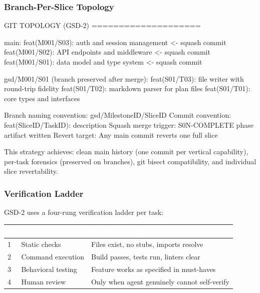 \documentclass[11pt,letterpaper]{article}
\newcommand{\tableheader}[1]{\textbf{\sffamily\textcolor{white}{#1}}}
\begin{document}
\subsubsection{Branch-Per-Slice Topology}

\begin{asciibox}
GIT TOPOLOGY (GSD-2)
====================

main:
  feat(M001/S03): auth and session management       <- squash commit
  feat(M001/S02): API endpoints and middleware      <- squash commit
  feat(M001/S01): data model and type system        <- squash commit

gsd/M001/S01 (branch preserved after merge):
  feat(S01/T03): file writer with round-trip fidelity
  feat(S01/T02): markdown parser for plan files
  feat(S01/T01): core types and interfaces

Branch naming convention: gsd/{MilestoneID}/{SliceID}
Commit convention:        feat({SliceID}/{TaskID}): description
Squash merge trigger:     S0N-COMPLETE phase artifact written
Revert target:            Any main commit reverts one full slice
\end{asciibox}

This strategy achieves: clean main history (one commit per vertical capability), per-task forensics (preserved on branches), git bisect compatibility, and individual slice revertability.

\subsubsection{Verification Ladder}

GSD-2 uses a four-rung verification ladder per task:

\begin{center}
\begin{tabularx}{\textwidth}{C{0.5cm}L{3.5cm}X}
\toprule
{}
\tableheader{\#} & \tableheader{Level} & \tableheader{What is Checked} \\
 & Static checks & Files exist, no stubs, imports resolve \\
2 & Command execution & Build passes, tests run, linters clear \\
3 & Behavioral testing & Feature works as specified in must-haves \\
4 & Human review & Only when agent genuinely cannot self-verify \\
\bottomrule
\end{tabularx}
\end{center}
\end{document}
